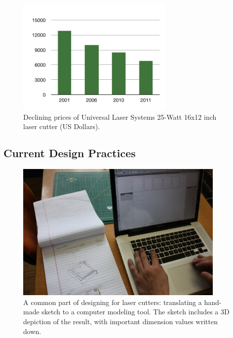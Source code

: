 \documentclass[11pt]{article}
\begin{document}
%

\begin{figure}[h] %
   \centering
   \includegraphics[width=3in]{img/prices.pdf} 
   \caption{Declining prices of Universal Laser Systems 25-Watt 16x12
     inch laser cutter (US Dollars).}
   \label{fig:prices}
\end{figure}

\subsection{Current Design Practices}

\begin{figure}[h] %
   \centering
   \includegraphics[width=4in]{img/translate-sketch-to-computer.jpg} 
   \caption{A common part of designing for laser cutters: translating
     a hand-made sketch to a computer modeling tool. The sketch
     includes a 3D depiction of the result, with important dimension
     values written down.}
   \label{fig:translating-to-computer}
\end{figure}
\end{document}
